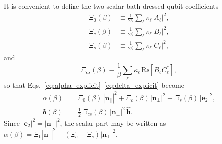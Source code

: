 It is convenient to define the two scalar bath-dressed qubit coefficients
\begin{align}
    \Xi_0(\beta)&\equiv \frac{1}{2\beta}\sum_{\ell}\kappa_\ell |A_\ell|^2, \nonumber\\
    \Xi_c(\beta)&\equiv \frac{1}{2\beta}\sum_{\ell}\kappa_\ell |B_\ell|^2, \nonumber\\
    \Xi_s(\beta)&\equiv \frac{1}{2\beta}\sum_{\ell}\kappa_\ell |C_\ell|^2,
\end{align}
and
\begin{equation}
    \Xi_{cs}(\beta)\equiv \frac{1}{\beta}\sum_{\ell}\kappa_\ell\,\mathrm{Re}[B_\ell C_\ell^*],
\end{equation}
so that Eqs.~\eqref{eq:alpha_explicit}--\eqref{eq:delta_explicit} become
\begin{align}
    \alpha(\beta)
    &= \Xi_0(\beta)\,|\mathbf n_\parallel|^2
       + \Xi_c(\beta)\,|\mathbf n_\perp|^2
       + \Xi_s(\beta)\,|\mathbf e_2|^2,
       \label{eq:alpha_compact}\\
    \boldsymbol\delta(\beta)
    &= \frac{1}{2}\,\Xi_{cs}(\beta)\,|\mathbf n_\perp|^2\,\hat{\mathbf h}.
       \label{eq:delta_compact}
\end{align}
Since $|\mathbf e_2|^2=|\mathbf n_\perp|^2$, the scalar part may be written as
$\alpha(\beta)=\Xi_0|\mathbf n_\parallel|^2+(\Xi_c+\Xi_s)|\mathbf n_\perp|^2$.


